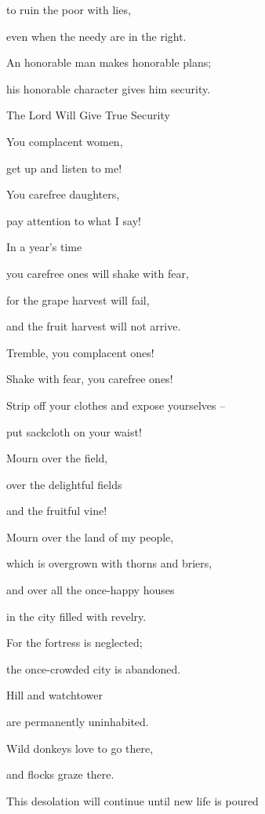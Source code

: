 {\par }{\Q to ruin
the poor with
lies,
\par }{\Q even when the needy
are in the right.
\par }{\Q {}An honorable
man makes honorable
plans;
\par }{\Q his honorable
character gives him security.
\par }{\SH The Lord Will Give True Security
\par }{\Q {}You complacent
women,
\par }{\Q get
up and listen
to me!
\par }{\Q You carefree
daughters,
\par }{\Q pay attention
to what I say!
\par }{\Q {}In
a year’s
time
\par }{\Q you carefree ones
will shake
with fear,
\par }{\Q for
the grape harvest
will fail,
\par }{\Q and the fruit harvest
will not
arrive.
\par }{\Q {}Tremble,
you complacent
ones!
\par }{\Q Shake
with fear, you carefree
ones!
\par }{\Q Strip
off your clothes and expose yourselves –
\par }{\Q put sackcloth on your waist!
\par }{\Q {}Mourn
over
the field,
\par }{\Q over
the delightful
fields
\par }{\Q and the fruitful
vine!
\par }{\Q {}Mourn over
the land
of my people,
\par }{\Q which is overgrown
with thorns
and briers,
\par }{\Q and over
all
the once-happy
houses
\par }{\Q in the city
filled with revelry.
\par }{\Q {}For
the fortress
is neglected;
\par }{\Q the once-crowded
city
is abandoned.
\par }{\Q Hill
and watchtower
\par }{\Q are permanently
uninhabited.
\par }{\Q Wild donkeys
love
to go there,
\par }{\Q and flocks
graze there.
\par }{\Q {}This desolation will continue until
new life
is poured
}
